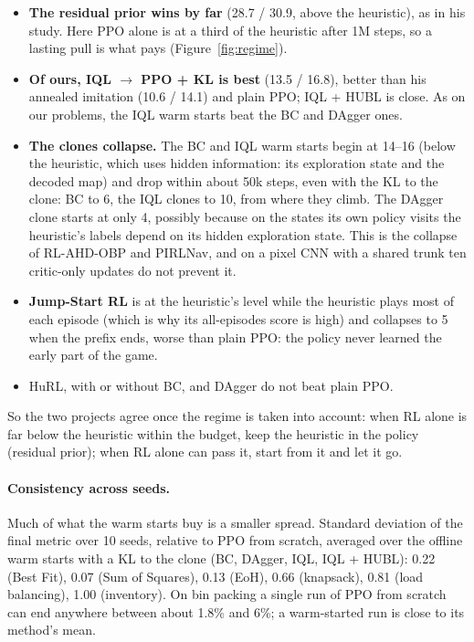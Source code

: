 \documentclass[11pt,a4paper]{article}
\begin{document}
\begin{itemize}[leftmargin=*]
\item \textbf{The residual prior wins by far} (28.7 / 30.9, above the heuristic), as in his study. Here PPO alone is
  at a third of the heuristic after 1M steps, so a lasting pull is what pays (Figure~\ref{fig:regime}).
\item \textbf{Of ours, IQL $\to$ PPO + KL is best} (13.5 / 16.8), better than his annealed imitation (10.6 / 14.1) and
  plain PPO; IQL + HUBL is close. As on our problems, the IQL warm starts beat the BC and DAgger ones.
\item \textbf{The clones collapse.} The BC and IQL warm starts begin at 14--16 (below the heuristic, which uses
  hidden information: its exploration state and the decoded map) and drop within about 50k steps, even with the KL to
  the clone: BC to 6, the IQL clones to 10, from where they climb. The DAgger clone starts at only 4, possibly
  because on the states its own policy visits the heuristic's labels depend on its hidden exploration state. This is the collapse of RL-AHD-OBP and PIRLNav, and on a
  pixel CNN with a shared trunk ten critic-only updates do not prevent it.
\item \textbf{Jump-Start RL} is at the heuristic's level while the heuristic plays most of each episode (which is
  why its all-episodes score is high) and collapses to 5 when the prefix ends, worse than plain PPO: the policy never
  learned the early part of the game.
\item HuRL, with or without BC, and DAgger do not beat plain PPO.
\end{itemize}
So the two projects agree once the regime is taken into account: when RL alone is far below the heuristic within the
budget, keep the heuristic in the policy (residual prior); when RL alone can pass it, start from it and let it go.

\paragraph{Consistency across seeds.} Much of what the warm starts buy is a smaller spread. Standard deviation of the
final metric over 10 seeds, relative to PPO from scratch, averaged over the offline warm starts with a KL to the clone
(BC, DAgger, IQL, IQL + HUBL): 0.22 (Best Fit), 0.07 (Sum of Squares), 0.13 (EoH), 0.66 (knapsack), 0.81 (load
balancing), 1.00 (inventory). On bin packing a single run of PPO from scratch can end anywhere between about 1.8\% and
6\%; a warm-started run is close to its method's mean.
\end{document}
